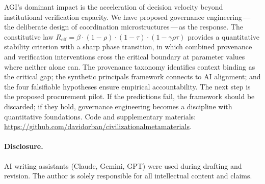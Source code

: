 \documentclass[runningheads]{llncs}
\begin{document}
AGI's dominant impact is the acceleration of decision velocity beyond institutional verification capacity. We have proposed governance engineering\,---\,the deliberate design of coordination microstructures\,---\,as the response. The constitutive law $R_{\mathrm{eff}} = \beta \cdot (1-\rho) \cdot (1-\tau) \cdot (1-\gamma \rho \tau)$ provides a quantitative stability criterion with a sharp phase transition, in which combined provenance and verification interventions cross the critical boundary at parameter values where neither alone can. The provenance taxonomy identifies context binding as the critical gap; the synthetic principals framework connects to AI alignment; and the four falsifiable hypotheses ensure empirical accountability. The next step is the proposed procurement pilot. If the predictions fail, the framework should be discarded; if they hold, governance engineering becomes a discipline with quantitative foundations. Code and supplementary materials: \url{https://github.com/davidorban/civilizationalmetamaterials}.

\paragraph{Disclosure.} AI writing assistants (Claude, Gemini, GPT) were used during drafting and revision. The author is solely responsible for all intellectual content and claims.



\end{document}
